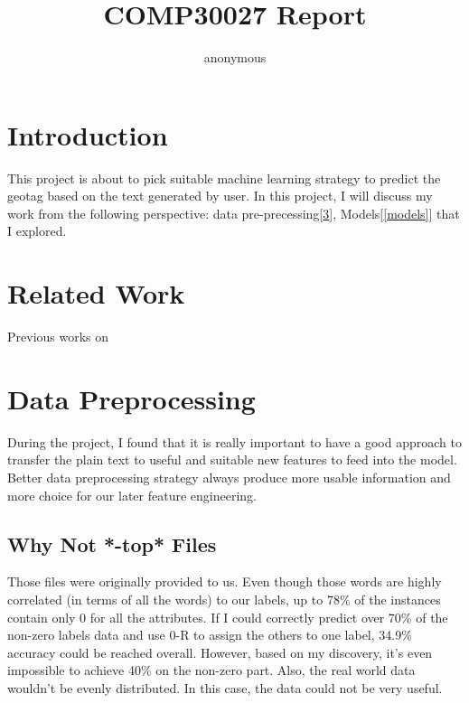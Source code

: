 \documentclass[11pt]{article}
\author{anonymous}
\title{COMP30027 Report}
\begin{document}
\maketitle

\section{Introduction}
This project is about to pick suitable machine learning strategy to
predict the geotag based on the text generated by user. In this
project, I will discuss my work from the following perspective:
data pre-precessing[\ref{sec2}], Models[\ref{models}] that I explored.

\section{Related Work}
Previous works on 

\section{Data Preprocessing}
\label{sec2}
During the project, I found that it is really important to have a good approach to transfer 
the plain text to useful and suitable new features to feed into the model.
Better data preprocessing strategy always produce more usable information 
and more choice for our later feature engineering.

\subsection{Why Not *-top* Files}
Those files were originally provided to us. Even though those words
are highly correlated (in terms of all the words) to our labels, up to 78\% of the 
instances contain only 0 for all the attributes. If I could 
correctly predict over 70\% of the non-zero labels data and use 
0-R to assign the others to one label, 34.9\% accuracy could be 
reached overall. However, based on my discovery, it's even impossible to achieve
40\% on the non-zero part. Also, the real world
data wouldn't be evenly distributed. In this case, the data could not be very useful.
\end{document}
